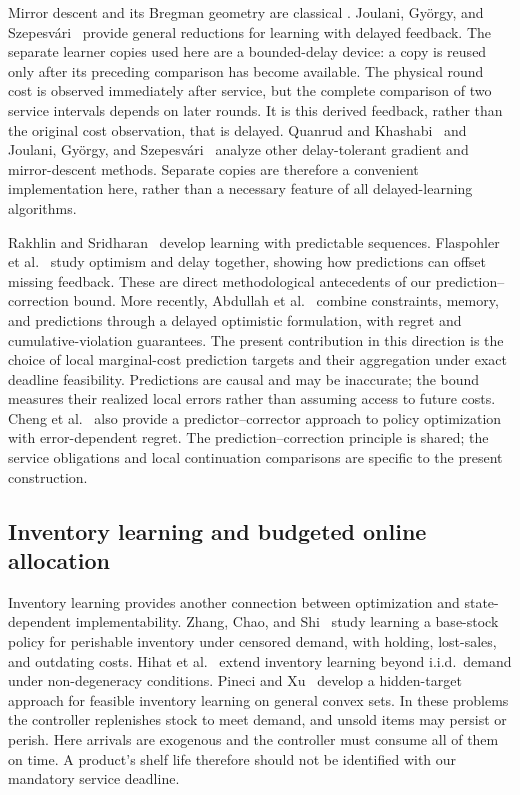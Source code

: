 \documentclass[11pt]{article}
\theoremstyle{plain}
\theoremstyle{remark}
\numberwithin{equation}{section}
\begin{document}
Mirror descent and its Bregman geometry are classical
\cite{BECK2003167}. Joulani, Gy\"orgy, and
Szepesv\'ari~\cite{joulani2013delayed} provide general reductions for
learning with delayed feedback. The separate learner copies used here
are a bounded-delay device: a copy is reused only after its preceding
comparison has become available. The physical round cost is observed
immediately after service, but the complete comparison of two service
intervals depends on later rounds. It is this derived feedback, rather
than the original cost observation, that is delayed.
Quanrud and Khashabi~\cite{quanrud2015delays} and Joulani,
Gy\"orgy, and Szepesv\'ari~\cite{joulani2016delay} analyze other
delay-tolerant gradient and mirror-descent methods. Separate copies are
therefore a convenient implementation here, rather than a necessary
feature of all delayed-learning algorithms.

Rakhlin and Sridharan~\cite{RakhlinSridharan2013} develop learning with
predictable sequences. Flaspohler et al.~\cite{flaspohler2021optimism}
study optimism and delay together, showing how predictions can offset
missing feedback. These are direct methodological antecedents of our
prediction--correction bound. More recently, Abdullah
et al.~\cite{abdullah2026memory} combine constraints, memory, and
predictions through a delayed optimistic formulation, with regret and
cumulative-violation guarantees. The present contribution in this
direction is the choice of local marginal-cost prediction targets and
their aggregation under exact deadline feasibility. Predictions are
causal and may be inaccurate; the bound measures their realized local
errors rather than assuming access to future costs.
Cheng et al.~\cite{cheng2019predictor} also provide a predictor--corrector
approach to policy optimization with error-dependent regret. The
prediction--correction principle is shared; the service obligations and
local continuation comparisons are specific to the present construction.

\subsection{Inventory learning and budgeted online allocation}

Inventory learning provides another connection between optimization and
state-dependent implementability. Zhang, Chao, and
Shi~\cite{zhang2018perishable} study learning a base-stock policy for
perishable inventory under censored demand, with holding, lost-sales,
and outdating costs. Hihat et al.~\cite{hihat2023inventory} extend
inventory learning beyond i.i.d.\ demand under non-degeneracy conditions.
Pineci and Xu~\cite{pineci2026inventory} develop a hidden-target approach
for feasible inventory learning on general convex sets. In these
problems the controller replenishes stock to meet demand, and unsold
items may persist or perish. Here arrivals are exogenous and the
controller must consume all of them on time. A product's shelf life
therefore should not be identified with our mandatory service deadline.
\end{document}
